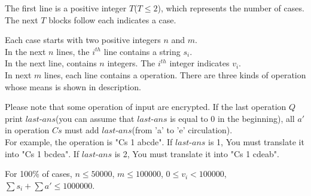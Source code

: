 The first line is a positive integer $T$($T \leq 2$), which represents the number of cases. The next $T$ blocks follow each indicates a case.

Each case starts with two positive integers $n$ and $m$.\\
In the next $n$ lines, the $i^{th}$ line contains a string $s_{i}$.\\
In the next line, contains $n$ integers. The $i^{th}$ integer indicates $v_{i}$.\\
In next $m$ lines, each line contains a operation. There are three kinds of operation whose means is shown in description.

Please note that some operation of input are encrypted. If the last operation $Q$ print $last$-$ans$(you can assume that $last$-$ans$ is equal to 0 in the beginning), all $a'$ in operation $Cs$ must add $last$-$ans$(from 'a' to 'e' circulation).\\
For example, the operation is "Cs 1 abcde". If $last$-$ans$ is 1, You must translate it into "Cs 1 bcdea". If $last$-$ans$ is 2, You must translate it into "Cs 1 cdeab".

For 100\% of cases, $n \leq 50000$, $m \leq 100000$, $0 \leq v_{i} < 100000$, $\sum s_{i} + \sum a' \leq 1000000$.